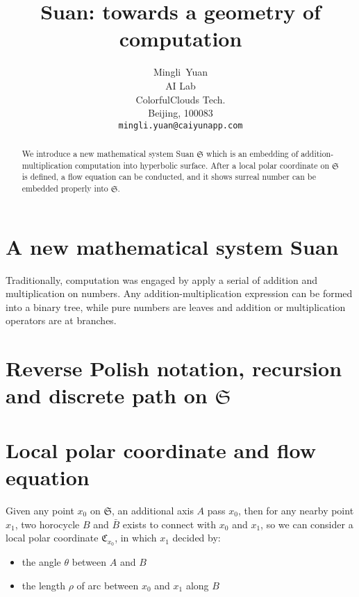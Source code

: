 \documentclass{article}
\title{Suan: towards a geometry of computation}
\author{
  Mingli~Yuan \\
  AI Lab \\
  ColorfulClouds Tech.\\
  Beijing, 100083 \\
  \texttt{mingli.yuan@caiyunapp.com} \\
}
\begin{document}
\maketitle

\begin{abstract}
    We introduce a new mathematical system Suan $\mathfrak{S}$ which is an embedding of addition-multiplication
    computation into hyperbolic surface. After a local polar coordinate on $\mathfrak{S}$ is defined, a flow
    equation can be conducted, and it shows surreal number can be embedded properly into $\mathfrak{S}$.
\end{abstract}


\section{A new mathematical system Suan}\label{sec:anmss}

Traditionally, computation was engaged by apply a serial of addition and multiplication on numbers. Any
addition-multiplication expression can be formed into a binary tree, while pure numbers are leaves and addition or
multiplication operators are at branches.

\section{Reverse Polish notation, recursion and discrete path on $\mathfrak{S}$}\label{sec:rpnradp}

\section{Local polar coordinate and flow equation}\label{sec:lpcsafe}

Given any point $x_0$ on $\mathfrak{S}$, an additional axis $A$ pass $x_0$, then for any nearby point $x_1$, two
horocycle $B$ and $\bar{B}$ exists to connect with $x_0$ and $x_1$, so we can consider a local polar coordinate
$\mathfrak{C}_{x_0}$, in which $x_1$ decided by:
\begin{itemize}
    \item the angle $\theta$ between $A$ and $B$
    \item the length $\rho$ of arc between $x_0$ and $x_1$ along $B$
\end{itemize}
\end{document}
